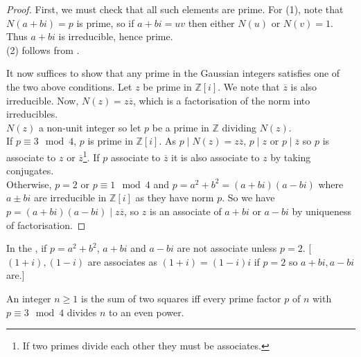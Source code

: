 \begin{proof}
	First, we must check that all such elements are prime.
	For (1), note that $N(a+bi) = p$ is prime, so if $a+bi = uv$ then either $N(u)$ or $N(v) = 1$. 
	Thus $a + bi$ is irreducible, hence prime. \\
	(2) follows from .

	It now suffices to show that any prime in the Gaussian integers satisfies one of the two above conditions.
	Let $z$ be prime in $\mathbb Z[i]$.
	We note that $\overline z$ is also irreducible.
	Now, $N(z) = z\overline z$, which is a factorisation of the norm into irreducibles. \\
	$N(z)$ a non-unit integer so let $p$ be a prime in $\mathbb Z$ dividing $N(z)$. \\
	If $p \equiv 3 \mod 4$, $p$ is prime in $\mathbb Z[i]$.
	As $p \mid N(z) = z \overline z$, $p \mid z$ or $p \mid \overline z$ so $p$ is associate to $z$ or $\overline z$\footnote{If two primes divide each other they must be associates.}. 
	If $p$ associate to $\overline z$ it is also associate to $z$ by taking conjugates. \\
	Otherwise, $p = 2$ or $p \equiv 1 \mod 4$ and $p = a^2 + b^2 = (a+bi)(a-bi)$ where $a \pm bi$ are irreducible in $\mathbb Z[i]$ as they have norm $p$.
	So we have $p = (a+bi)(a-bi) \mid z \overline z$, so $z$ is an associate of $a+bi$ or $a-bi$ by uniqueness of factorisation.
\end{proof}

\begin{remark}
	In the , if $p = a^2 + b^2$, $a+bi$ and $a-bi$ are not associate unless $p = 2$.
	[$(1+i), (1-i)$ are associates as $(1+i) = (1 - i)i$ if $p = 2$ so $a+bi, a-bi$ are.]
\end{remark}

\begin{corollary} \label{cor:12.1}
	An integer $n \geq 1$ is the sum of two squares iff every prime factor $p$ of $n$ with $p \equiv 3 \mod 4$ divides $n$ to an even power.
\end{corollary}

